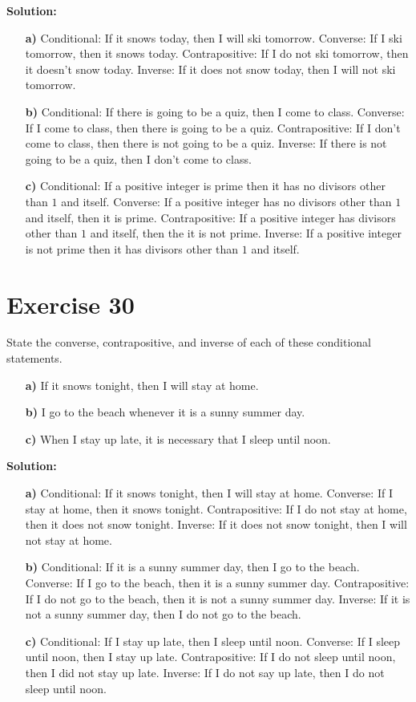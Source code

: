 \documentclass{Axon}
\begin{document}
\noindent
\textbf{Solution:}
\begin{enumerate}
    \item[\textbf{a)}] Conditional: If it snows today, then I will ski tomorrow. Converse: If I ski tomorrow, then it snows today. Contrapositive: If I do not ski tomorrow, then it doesn't snow today. Inverse: If it does not snow today, then I will not ski tomorrow.
    \item[\textbf{b)}] Conditional: If there is going to be a quiz, then I come to class. Converse: If I come to class, then there is going to be a quiz. Contrapositive: If I don't come to class, then there is not going to be a quiz. Inverse: If there is not going to be a quiz, then I don't come to class.
    \item[\textbf{c)}] Conditional: If a positive integer is prime then it has no divisors other than \(1\) and itself. Converse: If a positive integer has no divisors other than \(1\) and itself, then it is prime. Contrapositive: If a positive integer has divisors other than \(1\) and itself, then the it is not prime. Inverse: If a positive integer is not prime then it has divisors other than \(1\) and itself.
\end{enumerate}

\section*{Exercise 30}
State the converse, contrapositive, and inverse of each of these conditional statements.
\begin{enumerate}
    \item[\textbf{a)}] If it snows tonight, then I will stay at home.
    \item[\textbf{b)}] I go to the beach whenever it is a sunny summer day.
    \item[\textbf{c)}] When I stay up late, it is necessary that I sleep until noon.
\end{enumerate}

\noindent
\textbf{Solution:}
\begin{enumerate}
    \item[\textbf{a)}] Conditional: If it snows tonight, then I will stay at home. Converse: If I stay at home, then it snows tonight. Contrapositive: If I do not stay at home, then it does not snow tonight. Inverse: If it does not snow tonight, then I will not stay at home.
    \item[\textbf{b)}] Conditional: If it is a sunny summer day, then I go to the beach. Converse: If I go to the beach, then it is a sunny summer day. Contrapositive: If I do not go to the beach, then it is not a sunny summer day. Inverse: If it is not a sunny summer day, then I do not go to the beach.
    \item[\textbf{c)}] Conditional: If I stay up late, then I sleep until noon. Converse: If I sleep until noon, then I stay up late. Contrapositive: If I do not sleep until noon, then I did not stay up late. Inverse: If I do not say up late, then I do not sleep until noon.
\end{enumerate}
\end{document}
